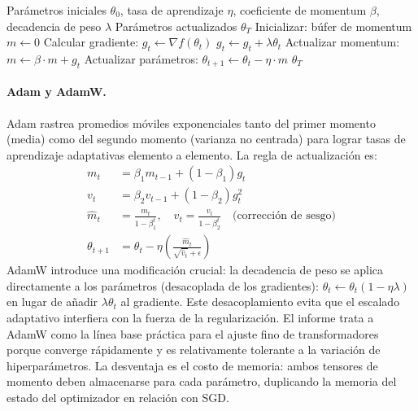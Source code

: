 \begin{algorithm}[H]
\caption{SGD con Momentum}
\label{alg:sgd-momentum}
\begin{algorithmic}[1]
\Require Parámetros iniciales $\theta_0$, tasa de aprendizaje $\eta$, coeficiente de momentum $\beta$, decadencia de peso $\lambda$
\Ensure Parámetros actualizados $\theta_T$
\State Inicializar: búfer de momentum $m \gets 0$
    \State Calcular gradiente: $g_t \gets \nabla f(\theta_t)$
        \State $g_t \gets g_t + \lambda \theta_t$ 
    \EndIf
    \State Actualizar momentum: $m \gets \beta \cdot m + g_t$
    \State Actualizar parámetros: $\theta_{t+1} \gets \theta_t - \eta \cdot m$
\EndFor
\Return $\theta_T$
\end{algorithmic}
\end{algorithm}

\paragraph{Adam y AdamW.}
Adam rastrea promedios móviles exponenciales tanto del primer momento (media) como del segundo momento (varianza no centrada) para lograr tasas de aprendizaje adaptativas elemento a elemento. La regla de actualización es:
\begin{align}
m_t &= \beta_1 m_{t-1} + (1-\beta_1) g_t \\
v_t &= \beta_2 v_{t-1} + (1-\beta_2) g_t^2 \\
\hat{m}_t &= \frac{m_t}{1-\beta_1^t}, \quad \hat{v}_t = \frac{v_t}{1-\beta_2^t} \quad \text{(corrección de sesgo)} \\
\theta_{t+1} &= \theta_t - \eta \left(\frac{\hat{m}_t}{\sqrt{\hat{v}_t}+\epsilon}\right)
\end{align}
AdamW introduce una modificación crucial: la decadencia de peso se aplica directamente a los parámetros (desacoplada de los gradientes): $\theta_t \gets \theta_t(1-\eta\lambda)$ en lugar de añadir $\lambda\theta_t$ al gradiente. Este desacoplamiento evita que el escalado adaptativo interfiera con la fuerza de la regularización. El informe trata a AdamW como la línea base práctica para el ajuste fino de transformadores porque converge rápidamente y es relativamente tolerante a la variación de hiperparámetros. La desventaja es el costo de memoria: ambos tensores de momento deben almacenarse para cada parámetro, duplicando la memoria del estado del optimizador en relación con SGD.

